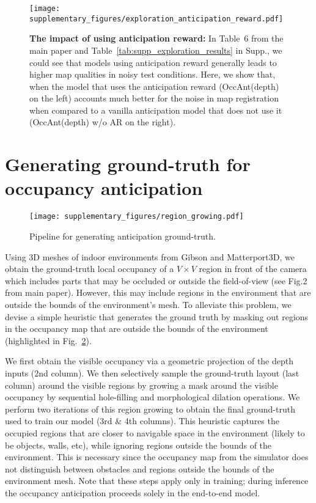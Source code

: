 \documentclass[runningheads]{llncs}
\begin{document}
\begin{figure}
    \centering
    \texttt{[image: supplementary\_figures/exploration\_anticipation\_reward.pdf]}
    \caption{\small \textbf{The impact of using anticipation reward:} In Table~6 from the main paper and Table~\ref{tab:supp_exploration_results} in Supp., we could see that models using anticipation reward generally leads to higher map qualities in noisy test conditions. Here, we show that, when the model that uses the anticipation reward (OccAnt(depth) on the left) accounts much better for the noise in map registration when compared to a vanilla anticipation model that does not use it (OccAnt(depth) w/o AR on the right).}
    \label{fig:exp_occant_anticipation_reward}
\end{figure}



\vfill
\pagebreak


\section{Generating ground-truth for occupancy anticipation}
\label{sec:ground_truth_generation}
\begin{figure}[ht!]
    \centering
    \texttt{[image: supplementary\_figures/region\_growing.pdf]}
    \caption{Pipeline for generating anticipation ground-truth.}
    \label{fig:region_growing_figure}
\end{figure}


Using 3D meshes of indoor environments from Gibson and Matterport3D, we obtain the ground-truth local occupancy of a $V \times V$ region in front of the camera which includes parts that may be occluded or outside the field-of-view (see Fig.2 from main paper). However, this may include regions in the environment that are outside the bounds of the environment's mesh. To alleviate this problem, we devise a simple heuristic that generates the ground truth by masking out regions in the occupancy map that are outside the bounds of the environment (highlighted in Fig.~\ref{fig:region_growing_figure}). 

We first obtain the visible occupancy via a geometric projection of the depth inputs (2nd column). We then selectively sample the ground-truth layout (last column) around the visible regions by growing a mask around the visible occupancy by sequential hole-filling and morphological dilation operations. We perform two iterations of this region growing to obtain the final ground-truth used to train our model (3rd \& 4th columns). This heuristic captures the occupied regions that are closer to navigable space in the environment (likely to be objects, walls, etc), while ignoring regions outside the bounds of the environment. This is necessary since the occupancy map from the simulator does not distinguish between obstacles and regions outside the bounds of the environment mesh. Note that these steps apply only in training; during inference the occupancy anticipation proceeds solely in the end-to-end model.
\end{document}
